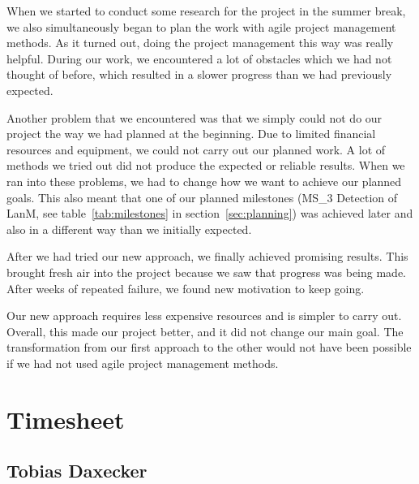 When we started to conduct some research for the project in the summer break, we also simultaneously began to plan the work with agile project management methods.
As it turned out, doing the project management this way was really helpful.
During our work, we encountered a lot of obstacles which we had not thought of before, which resulted in a slower progress than we had previously expected.

Another problem that we encountered was that we simply could not do our project the way we had planned at the beginning.
Due to limited financial resources and equipment, we could not carry out our planned work.
A lot of methods we tried out did not produce the expected or reliable results.
When we ran into these problems, we had to change how we want to achieve our planned goals.
This also meant that one of our planned milestones (MS\_3 Detection of LanM, see table~\ref{tab:milestones} in section~\ref{sec:planning}) was achieved later and also in a different way than we initially expected.

After we had tried our new approach, we finally achieved promising results.
This brought fresh air into the project because we saw that progress was being made.
After weeks of repeated failure, we found new motivation to keep going.

Our new approach requires less expensive resources and is simpler to carry out.
Overall, this made our project better, and it did not change our main goal.
The transformation from our first approach to the other would not have been possible if we had not used agile project management methods.



\newpage


\section{Timesheet}

\subsection{Tobias Daxecker}

